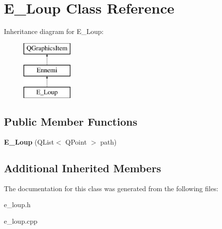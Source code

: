 \hypertarget{class_e___loup}{}\section{E\+\_\+\+Loup Class Reference}
\label{class_e___loup}
Inheritance diagram for E\+\_\+\+Loup\+:\begin{figure}[H]
\begin{center}
\leavevmode
\includegraphics[height=3.000000cm]{class_e___loup}
\end{center}
\end{figure}
\subsection*{Public Member Functions}
\begin{DoxyCompactItemize}
\item 
\hypertarget{class_e___loup_a666e273642dae36a9baf98dc47ee0dc9}{}{\bfseries E\+\_\+\+Loup} (Q\+List$<$ Q\+Point $>$ path)\label{class_e___loup_a666e273642dae36a9baf98dc47ee0dc9}

\end{DoxyCompactItemize}
\subsection*{Additional Inherited Members}


The documentation for this class was generated from the following files\+:\begin{DoxyCompactItemize}
\item 
e\+\_\+loup.\+h\item 
e\+\_\+loup.\+cpp\end{DoxyCompactItemize}
